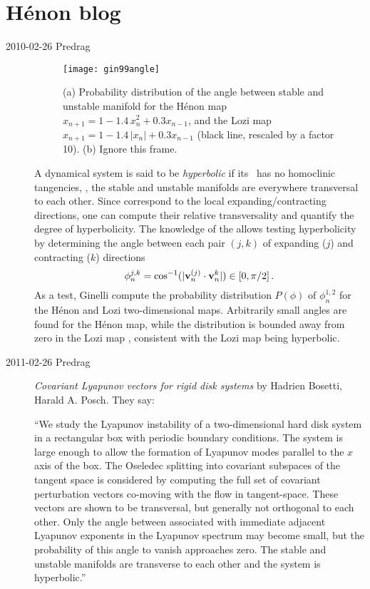 \section{H\'enon blog}

\begin{description}

\item[2010-02-26 Predrag]
%
\begin{figure}
\begin{center}
\texttt{[image: gin99angle]}
\end{center}
\caption{
(a) Probability distribution of the angle between stable and
unstable manifold for the H\'enon map $x_{n+1} = 1 -1.4\,
x_n^2 + 0.3 x_{n-1}$, and the Lozi map $x_{n+1} = 1
-1.4\,|x_n| + 0.3 x_{n-1}$ (black line, rescaled by a factor
10). (b) Ignore this frame.
}
\label{fig:gin99angle} %
\end{figure}
%

A dynamical system is said to be \emph{hyperbolic} if its
\statesp\ has no homoclinic tangencies, \ie, the stable and
unstable manifolds are everywhere transversal to each other.
Since {\cLvs} correspond to the local
expanding/contracting directions, one can compute their
relative transversality and quantify the degree of hyperbolicity.
The knowledge of the {\cLvs} allows testing hyperbolicity by
determining the angle between each pair $(j,k)$ of expanding
($j$) and contracting ($k$) directions
\[
\phi_n^{j,k} = \cos^{-1}(|{\bf v}_n^{(j)} \cdot{\bf v}_n^k|) \in [0,\pi/2]
\,.
\]
As a test, Ginelli \etal{} compute the
probability distribution $P(\phi)$ of $\phi_n^{1,2}$ for the
H\'enon and Lozi two-dimensional maps. Arbitrarily small
angles are found for the H\'enon map, while the distribution
is bounded away from zero in the Lozi map ,
consistent with the Lozi map being hyperbolic.

\item[2011-02-26 Predrag]
{\em Covariant Lyapunov vectors for rigid disk systems}
by Hadrien Bosetti, Harald A. Posch. They say:

``We study the Lyapunov instability of a two-dimensional hard disk system
in a rectangular box with periodic boundary conditions. The system is
large enough to allow the formation of Lyapunov modes parallel to the $x$
axis of the box. The Oseledec splitting into covariant subspaces of the
tangent space is considered by computing the full set of covariant
perturbation vectors co-moving with the flow in tangent-space. These
vectors are shown to be transversal, but generally not orthogonal to each
other. Only the angle between {\cLvs} associated with immediate
adjacent Lyapunov exponents in the Lyapunov spectrum may become small,
but the probability of this angle to vanish approaches zero. The stable
and unstable manifolds are transverse to each other and the system is
hyperbolic.''


\end{description}

